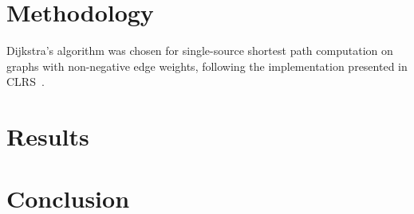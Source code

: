 \documentclass[12pt]{article}
\begin{document}
\section{Methodology}
Dijkstra's algorithm was chosen for single-source shortest path computation on graphs with non-negative edge weights, following the implementation presented in CLRS~\cite{clrsAlgorithms}.

\section{Results}

\section{Conclusion}



\end{document}

